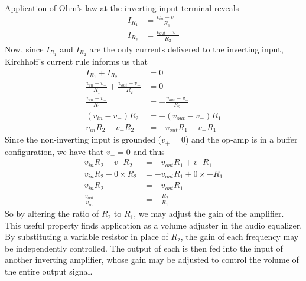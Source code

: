 \documentclass[notitlepage, 12pt]{report}
\begin{document}
Application of Ohm's law at the inverting input terminal
reveals 
\begin{align}
    I_{R_1} &= \frac{v_{in} - v_-}{R_1} \\
    I_{R_2} &=  \frac{v_{out} - v_-}{R_2}  
\end{align}
Now, since $I_{R_1}$ and $I_{R_2}$ are the only currents 
delivered to the inverting input, Kirchhoff's current rule informs us that 
\begin{align}
    I_{R_1} + I_{R_2} &= 0 \\
    \frac{v_{in} - v_-}{R_1} + \frac{v_{out} - v_-}{R_2} &= 0 \\
    \frac{v_{in} - v_-}{R_1} &= -\frac{v_{out} - v_-}{R_2} \\
    (v_{in} - v_-)R_2 &= -(v_{out} - v_-)R_1 \\
    v_{in}R_2 - v_-R_2 &= -v_{out}R_1 + v_-R_1
\end{align}
Since the non-inverting input is grounded ($v_+ = 0$) and the op-amp is 
in a buffer configuration, we have that $v_- = 0$ and thus 
\begin{align}
    v_{in}R_2 - v_-R_2 &= -v_{out}R_1 + v_-R_1 \\
    v_{in}R_2 - 0\times R_2 &= -v_{out}R_1 + 0\times -R_1 \\
    v_{in}R_2 &= -v_{out}R_1 \\
    \frac{v_{out}}{v_{in}} &= -\frac{R_2}{R_1}
\end{align}
So by altering the ratio of $R_2$ to $R_1$, we may 
adjust the gain of the amplifier. This useful property finds application 
as a volume adjuster in the audio equalizer. By substituting a variable 
resistor in place of $R_2$, the gain of each frequency may be independently
controlled. The output of each is then fed into the input of another 
inverting amplifier, whose gain may be adjusted to control the volume of the 
entire output signal. 
\end{document}
